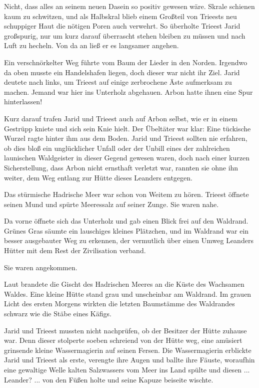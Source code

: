 Nicht, dass alles an seinem neuen Dasein so positiv gewesen wäre. Skrale schienen kaum zu schwitzen, und als Halbskral blieb einem Großteil von Trieests neu schuppiger Haut die nötigen Poren auch verwehrt. So überholte Trieest Jarid großspurig, nur um kurz darauf überrascht stehen bleiben zu müssen und nach Luft zu hecheln. Von da an ließ er es langsamer angehen.

Ein verschnörkelter Weg führte vom Baum der Lieder in den Norden. Irgendwo da oben musste ein Handelshafen liegen, doch dieser war nicht ihr Ziel. Jarid deutete nach links, um Trieest auf einige zerbrochene Äste aufmerksam zu machen. Jemand war hier ins Unterholz abgehauen. Arbon hatte ihnen eine Spur hinterlassen!

Kurz darauf trafen Jarid und Trieest auch auf Arbon selbst, wie er in einem Gestrüpp kniete und sich sein Knie hielt. Der Übeltäter war klar: Eine tückische Wurzel ragte hinter ihm aus dem Boden. Jarid und Trieest sollten nie erfahren, ob dies bloß ein unglücklicher Unfall oder der Unbill eines der zahlreichen launischen Waldgeister in dieser Gegend gewesen waren, doch nach einer kurzen Sicherstellung, dass Arbon nicht ernsthaft verletzt war, rannten sie ohne ihn weiter, dem Weg entlang zur Hütte dieses Leanders entgegen.



\trennzeichen



Das stürmische Hadrische Meer war schon von Weitem zu hören. Trieest öffnete seinen Mund und spürte Meeressalz auf seiner Zunge. Sie waren nahe.

Da vorne öffnete sich das Unterholz und gab einen Blick frei auf den Waldrand. Grünes Gras säumte ein lauschiges kleines Plätzchen, und im Waldrand war ein besser ausgebauter Weg zu erkennen, der vermutlich über einen Umweg Leanders Hütter mit dem Rest der Zivilisation verband.

Sie waren angekommen.

Laut brandete die Gischt des Hadrischen Meeres an die Küste des Wachsamen Waldes. Eine kleine Hütte stand grau und unscheinbar am Waldrand. Im grauen Licht des ersten Morgens wirkten die letzten Baumstämme des Waldrandes schwarz wie die Stäbe eines Käfigs.

Jarid und Trieest mussten nicht nachprüfen, ob der Besitzer der Hütte zuhause war. Denn dieser stolperte soeben schreiend von der Hütte weg, eine amüsiert grinsende kleine Wassermagierin auf seinen Fersen. Die Wassermagierin erblickte Jarid und Trieest als erste, verengte ihre Augen und ballte ihre Fäuste, woraufhin eine gewaltige Welle kalten Salzwassers vom Meer ins Land spülte und diesen ... Leander? ... von den Füßen holte und seine Kapuze beiseite wischte.

